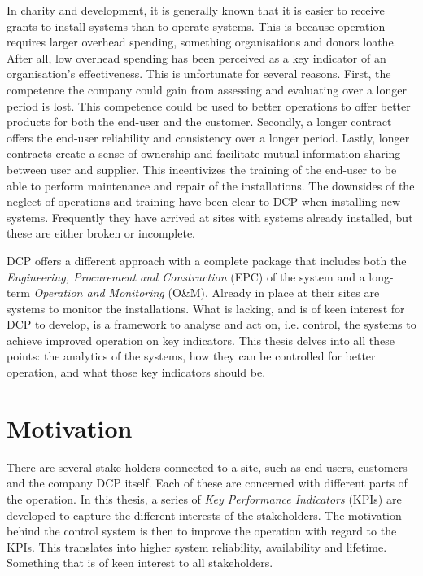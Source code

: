 In charity and development, it is generally known that it is easier to receive grants to install systems than to operate systems. This is because operation requires larger overhead spending, something organisations and donors loathe. After all, low overhead spending has been perceived as a key indicator of an organisation's effectiveness.\cite{Berrett2020-wi} This is unfortunate for several reasons. First, the competence the company could gain from assessing and evaluating over a longer period is lost. This competence could be used to better operations to offer better products for both the end-user and the customer. Secondly, a longer contract offers the end-user reliability and consistency over a longer period. Lastly, longer contracts create a sense of ownership and facilitate mutual information sharing between user and supplier. This incentivizes the training of the end-user to be able to perform maintenance and repair of the installations. The downsides of the neglect of operations and training have been clear to DCP when installing new systems. Frequently they have arrived at sites with systems already installed, but these are either broken or incomplete.

DCP offers a different approach with a complete package that includes both the \textit{Engineering, Procurement and Construction} (EPC) of the system and a long-term \textit{Operation and Monitoring} (O\&M). Already in place at their sites are systems to monitor the installations. What is lacking, and is of keen interest for DCP to develop, is a framework to analyse and act on, i.e. control, the systems to achieve improved operation on key indicators. This thesis delves into all these points: the analytics of the systems, how they can be controlled for better operation, and what those key indicators should be. 

\section{Motivation}

There are several stake-holders connected to a site, such as end-users, customers and the company DCP itself. Each of these are concerned with different parts of the operation. In this thesis, a series of \textit{Key Performance Indicators} (KPIs) are developed to capture the different interests of the stakeholders. The motivation behind the control system is then to improve the operation with regard to the KPIs. This translates into higher system reliability, availability and lifetime. Something that is of keen interest to all stakeholders.\\

